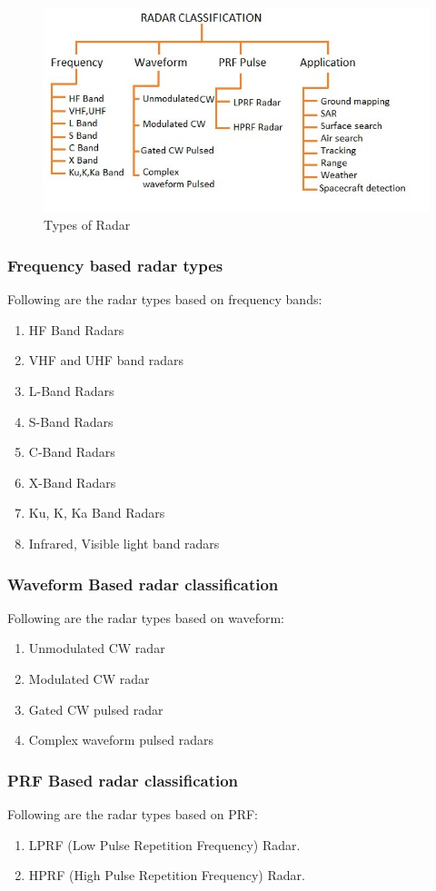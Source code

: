 \documentclass[14pt]{article} %
\begin{document}
 \begin{figure}[H]
  \includegraphics[width=\linewidth]{radartypes.png}
  \caption{ Types of Radar}
  \label{fig:figure 8}
\end{figure}
\subsubsection{Frequency based radar types}
 Following are the radar types based on frequency bands:
 \begin{enumerate}
\item	HF Band Radars
\item	VHF and UHF band radars
\item	L-Band Radars
\item	S-Band Radars 
\item	C-Band Radars 
\item	X-Band Radars 
\item	Ku, K, Ka Band Radars 
\item	Infrared, Visible light band radars
\end{enumerate}

\subsubsection{Waveform Based radar classification}
 Following are the radar types based on waveform:
\begin{enumerate}
\item	Unmodulated CW radar
\item	Modulated CW radar
\item	Gated CW pulsed radar
\item	Complex waveform pulsed radars
\end{enumerate}

\subsubsection{PRF Based radar classification}
Following are the radar types based on PRF:
\begin{enumerate}
\item	LPRF (Low Pulse Repetition Frequency) Radar.
\item	HPRF (High Pulse Repetition Frequency) Radar.
\end{enumerate}
\end{document}
